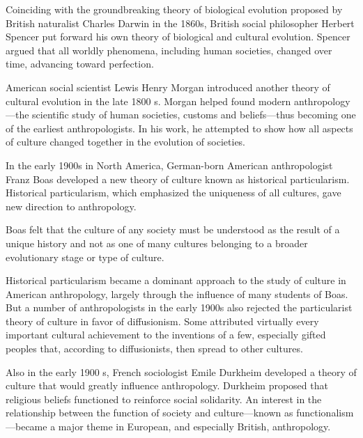 \TiGanSpace


Coinciding with the groundbreaking theory of biological evolution
proposed by British
naturalist Charles Darwin in the 1860s, British social
philosopher Herbert
Spencer put forward his own theory of biological and cultural
evolution. Spencer argued that all worldly phenomena, including human
societies, changed over time, advancing toward perfection. \linefill

American social
scientist Lewis
Henry Morgan introduced another theory of cultural evolution in the
late 1800 s. Morgan helped found modern anthropology---the scientific
study of human societies, customs and beliefs---thus becoming one of the
earliest anthropologists. In his work, he attempted to show how all
aspects of culture changed together in the evolution of societies. \linefill

In the early 1900s in North America, German-born American
anthropologist Franz
Boas developed a new theory of culture known as historical
particularism. Historical particularism, which emphasized the uniqueness
of all cultures, gave new direction to anthropology. \linefill

Boas felt that the culture of any society must be understood as the
result of a unique history and not as one of many cultures belonging to
a broader evolutionary stage or type of culture. \linefill

Historical particularism became a dominant approach to the study of
culture in American anthropology, largely through the influence of many
students of Boas. But a number of anthropologists in the early 1900s
also rejected the particularist theory of culture in favor of
diffusionism. Some attributed virtually every important cultural
achievement to the inventions of a few, especially gifted peoples that,
according to diffusionists, then spread to other cultures. \linefill

Also in the early 1900 s, French
sociologist Emile
Durkheim developed a theory of culture that would greatly influence
anthropology. Durkheim proposed that religious beliefs functioned to
reinforce social solidarity. An interest in the relationship between the
function of society and culture---known as functionalism---became a major theme in European, and
especially British, anthropology.

